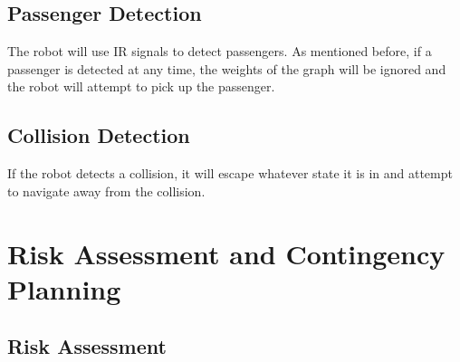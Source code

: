 \documentclass[12pt]{article}
\begin{document}
\subsection{Passenger Detection}
The robot will use IR signals to detect passengers.  As mentioned before, if a
passenger is detected at any time, the weights of the graph will be ignored and
the robot will attempt to pick up the passenger.
\subsection{Collision Detection}
If the robot detects a collision, it will escape whatever state it is in and
attempt to navigate away from the collision.

\section{Risk Assessment and Contingency Planning}
\subsection{Risk Assessment}
\end{document}
